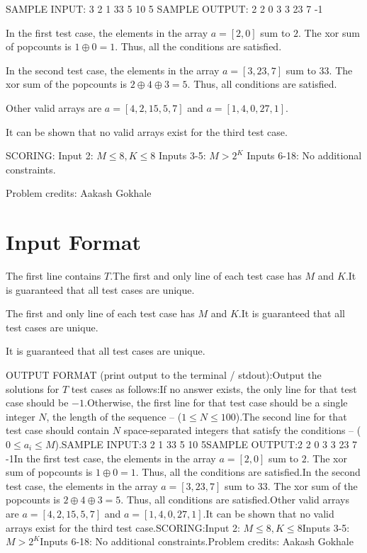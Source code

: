 \documentclass[12pt]{article}
\begin{document}
SAMPLE INPUT:
3
2 1
33 5
10 5
SAMPLE OUTPUT: 
2
2 0
3
3 23 7 
-1

In the first test case, the elements in the array $a = [2, 0]$ sum to $2$. The
xor sum of popcounts is $1 \oplus 0 = 1$. Thus, all the conditions are
satisfied.

In the second test case, the elements in the array $a = [3, 23, 7]$ sum to $33$.
The xor sum of the popcounts is $2 \oplus 4 \oplus 3 = 5$. Thus, all conditions
are satisfied.

Other valid arrays are $a = [4, 2, 15, 5, 7]$ and $a = [1, 4, 0, 27, 1]$.

It can be shown that no valid arrays exist for the third test case.

SCORING:
 Input 2: $M \leq 8, K \leq 8$ Inputs 3-5: $M > 2^K$ 
Inputs 6-18: No additional constraints.


Problem credits: Aakash Gokhale



\section*{Input Format}
The first line contains $T$.The first and only line of each test case has $M$ and $K$.It is guaranteed that all test cases are unique.

The first and only line of each test case has $M$ and $K$.It is guaranteed that all test cases are unique.

It is guaranteed that all test cases are unique.

OUTPUT FORMAT (print output to the terminal / stdout):Output the solutions for $T$ test cases as follows:If no answer exists, the only line for that test case should be $-1$.Otherwise, the first line for that test case should be a single integer $N$, the
length of the sequence -- ($1 \le  N \le 100$).The second line for that test case should contain $N$ space-separated integers
that satisfy the conditions -- ($0 \le a_i \le M$).SAMPLE INPUT:3
2 1
33 5
10 5SAMPLE OUTPUT:2
2 0
3
3 23 7 
-1In the first test case, the elements in the array $a = [2, 0]$ sum to $2$. The
xor sum of popcounts is $1 \oplus 0 = 1$. Thus, all the conditions are
satisfied.In the second test case, the elements in the array $a = [3, 23, 7]$ sum to $33$.
The xor sum of the popcounts is $2 \oplus 4 \oplus 3 = 5$. Thus, all conditions
are satisfied.Other valid arrays are $a = [4, 2, 15, 5, 7]$ and $a = [1, 4, 0, 27, 1]$.It can be shown that no valid arrays exist for the third test case.SCORING:Input 2: $M \leq 8, K \leq 8$Inputs 3-5: $M > 2^K$Inputs 6-18: No additional constraints.Problem credits: Aakash Gokhale
\end{document}
